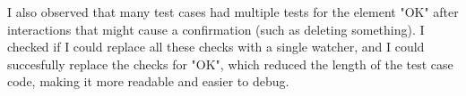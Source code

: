 I also observed that many test cases had multiple tests for the element "OK" after interactions that might cause a confirmation (such as deleting something). I checked if I could replace all these checks with a single watcher, and I could succesfully replace the checks for "OK", which reduced the length of the test case code, making it more readable and easier to debug.
